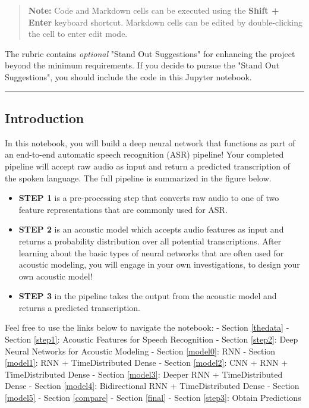 \documentclass[11pt]{article}
\providecommand{\tightlist}{%
      \setlength{\itemsep}{0pt}\setlength{\parskip}{0pt}}
\begin{document}
\begin{quote}
\textbf{Note:} Code and Markdown cells can be executed using the
\textbf{Shift + Enter} keyboard shortcut. Markdown cells can be edited
by double-clicking the cell to enter edit mode.
\end{quote}

The rubric contains \emph{optional} "Stand Out Suggestions" for
enhancing the project beyond the minimum requirements. If you decide to
pursue the "Stand Out Suggestions", you should include the code in this
Jupyter notebook.

\begin{center}\rule{0.5\linewidth}{\linethickness}\end{center}

\subsection{Introduction}\label{introduction}

In this notebook, you will build a deep neural network that functions as
part of an end-to-end automatic speech recognition (ASR) pipeline! Your
completed pipeline will accept raw audio as input and return a predicted
transcription of the spoken language. The full pipeline is summarized in
the figure below.

\begin{itemize}
\tightlist
\item
  \textbf{STEP 1} is a pre-processing step that converts raw audio to
  one of two feature representations that are commonly used for ASR.
\item
  \textbf{STEP 2} is an acoustic model which accepts audio features as
  input and returns a probability distribution over all potential
  transcriptions. After learning about the basic types of neural
  networks that are often used for acoustic modeling, you will engage in
  your own investigations, to design your own acoustic model!
\item
  \textbf{STEP 3} in the pipeline takes the output from the acoustic
  model and returns a predicted transcription.
\end{itemize}

Feel free to use the links below to navigate the notebook: -
Section \ref{thedata} - Section \ref{step1}: Acoustic Features for
Speech Recognition - Section \ref{step2}: Deep Neural Networks for
Acoustic Modeling - Section \ref{model0}: RNN - Section \ref{model1}:
RNN + TimeDistributed Dense - Section \ref{model2}: CNN + RNN +
TimeDistributed Dense - Section \ref{model3}: Deeper RNN +
TimeDistributed Dense - Section \ref{model4}: Bidirectional RNN +
TimeDistributed Dense - Section \ref{model5} - Section \ref{compare} -
Section \ref{final} - Section \ref{step3}: Obtain Predictions
\end{document}
